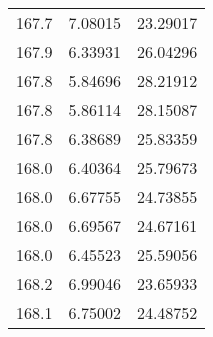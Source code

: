 \begin{table}
\begin{tabular}{S[table-format=3.1] S[table-format=1.5] S[table-format=2.5]}
    167.7 & 7.08015 & 23.29017 \\
    167.9 & 6.33931 & 26.04296 \\
    167.8 & 5.84696 & 28.21912 \\
    167.8 & 5.86114 & 28.15087 \\
    167.8 & 6.38689 & 25.83359 \\
    168.0 & 6.40364 & 25.79673 \\
    168.0 & 6.67755 & 24.73855 \\
    168.0 & 6.69567 & 24.67161 \\
    168.0 & 6.45523 & 25.59056 \\
    168.2 & 6.99046 & 23.65933 \\
    168.1 & 6.75002 & 24.48752 \\
    \bottomrule
  \end{tabular}
\end{table}

